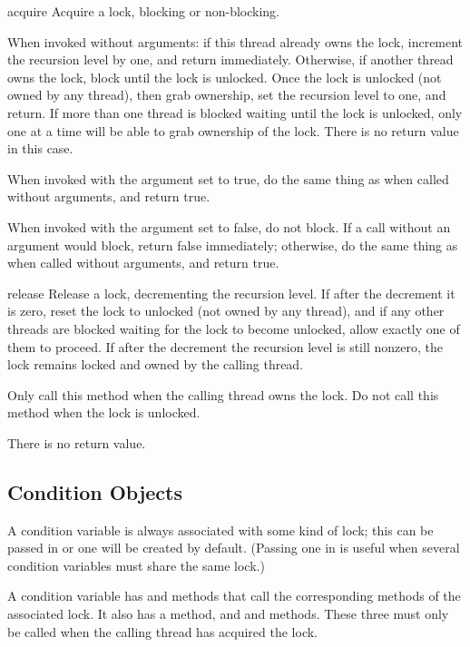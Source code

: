 \begin{methoddesc}{acquire}{}
Acquire a lock, blocking or non-blocking.

When invoked without arguments: if this thread already owns
the lock, increment the recursion level by one, and return
immediately.  Otherwise, if another thread owns the lock,
block until the lock is unlocked.  Once the lock is unlocked
(not owned by any thread), then grab ownership, set the
recursion level to one, and return.  If more than one thread
is blocked waiting until the lock is unlocked, only one at a
time will be able to grab ownership of the lock.  There is no
return value in this case.

When invoked with the  argument set to true, do the
same thing as when called without arguments, and return true.

When invoked with the  argument set to false, do not
block.  If a call without an argument would block, return false
immediately; otherwise, do the same thing as when called
without arguments, and return true.
\end{methoddesc}

\begin{methoddesc}{release}{}
Release a lock, decrementing the recursion level.  If after the
decrement it is zero, reset the lock to unlocked (not owned by any
thread), and if any other threads are blocked waiting for the lock to
become unlocked, allow exactly one of them to proceed.  If after the
decrement the recursion level is still nonzero, the lock remains
locked and owned by the calling thread.

Only call this method when the calling thread owns the lock.
Do not call this method when the lock is unlocked.

There is no return value.
\end{methoddesc}


\subsection{Condition Objects \label{condition-objects}}

A condition variable is always associated with some kind of lock;
this can be passed in or one will be created by default.  (Passing
one in is useful when several condition variables must share the
same lock.)

A condition variable has  and 
methods that call the corresponding methods of the associated lock.
It also has a  method, and  and
 methods.  These three must only be called when
the calling thread has acquired the lock.

